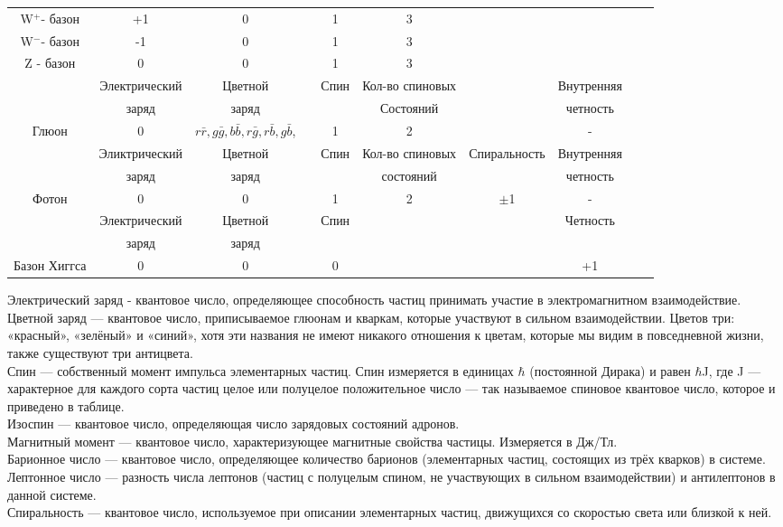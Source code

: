 \documentclass{article}
\begin{document}
\begin{table}[h]
\begin{center}
\begin{tabular}{cccccccccc}
W$^+$- базон & +1& 0&& 1&3\\
W$^-$- базон& -1 &0 &&1&3\\
Z -  базон&0 &0 && 1&3\\
\hline
& Электрический &Цветной&& Спин &Кол-во спиновых&& Внутренняя\\
& заряд &заряд&& & Состояний&& четность \\
Глюон& 0& $r\bar r, g\bar g, b\bar b, r\bar g, r\bar b, g\bar b$,&& 1& 2&& -
\\
\hline
&Эликтрический& Цветной&& Спин& Кол-во спиновых& Спиральность& Внутренняя\\
&заряд& заряд&&& состояний&&четность\\
Фотон &0& 0&& 1& 2& $\pm$1& -
\\
\hline
&Электрический& Цветной&& Спин&&& Четность\\
&заряд& заряд\\
Базон Хиггса &0& 0&& 0&&& +1\\
\hline

\end{tabular}
\end{center}
\end{table}
Электрический заряд - квантовое число, определяющее способность частиц принимать участие в электромагнитном взаимодействие.\\
Цветной заряд — квантовое число, приписываемое глюонам и кваркам, которые участвуют в сильном взаимодействии. Цветов три: «красный», «зелёный» и «синий», хотя эти названия не имеют никакого отношения к цветам, которые мы видим в повседневной жизни, также существуют три антицвета.\\
Спин — собственный момент импульса элементарных частиц. Спин измеряется в единицах $\hbar$ (постоянной Дирака) и равен $\hbar$J, где J — характерное для каждого сорта частиц целое или полуцелое положительное число — так называемое спиновое квантовое число, которое и приведено в таблице.\\
Изоспин — квантовое число, определяющая число зарядовых состояний адронов.\\
Магнитный момент — квантовое число, характеризующее магнитные свойства частицы. Измеряется в Дж/Тл.\\
Барионное число — квантовое число, определяющее количество барионов (элементарных частиц, состоящих из трёх кварков) в системе.\\
Лептонное число — разность числа лептонов (частиц с полуцелым спином, не участвующих в сильном взаимодействии) и антилептонов в данной системе.\\
Спиральность — квантовое число, используемое при описании элементарных частиц, движущихся со скоростью света или близкой к ней.
\end{document}

